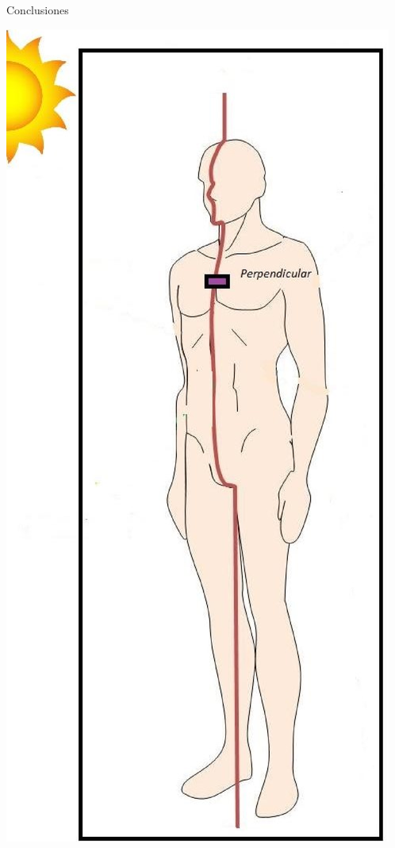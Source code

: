 \documentclass{article}
\begin{document}
\begin{multicols}{2}
\begin{center}
\begin{shaded}
\changefontsizes{12pt}
\textcolor{na}{Conclusiones}
\end{shaded}
\end{center}
\begin{minipage}{0.22\linewidth}
\includegraphics[scale=0.18]{images/cuerpo.eps}

\end{minipage}
\end{multicols}
\end{document}
